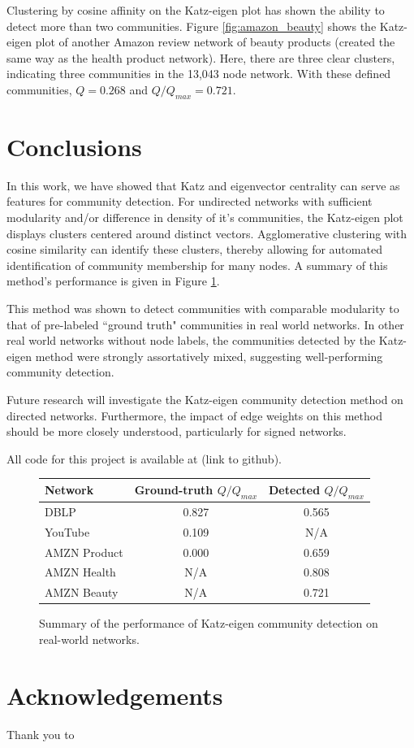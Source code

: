 \documentclass{IEEEtran}
\begin{document}
	Clustering by cosine affinity on the Katz-eigen plot has shown the ability to detect more than two communities. Figure \ref{fig:amazon_beauty} shows the Katz-eigen plot of another Amazon review network of beauty products (created the same way as the health product network). Here, there are three clear clusters, indicating three communities in the 13,043 node network. With these defined communities, $Q=0.268$ and $Q/Q_{max}=0.721$.
	
	
	\section{Conclusions}
	\label{s:conc}
	In this work, we have showed that Katz and eigenvector centrality can serve as features for community detection. For undirected networks with sufficient modularity and/or difference in density of it's communities, the Katz-eigen plot displays clusters centered around distinct vectors. Agglomerative clustering with cosine similarity can identify these clusters, thereby allowing for automated identification of community membership for many nodes. A summary of this method's performance is given in Figure \ref{tab:performance}.
	
	This method was shown to detect communities with comparable modularity to that of pre-labeled ``ground truth" communities in real world networks. In other real world networks without node labels, the communities detected by the Katz-eigen method were strongly assortatively mixed, suggesting well-performing community detection.
	
	Future research will investigate the Katz-eigen community detection method on directed networks. Furthermore, the impact of edge weights on this method should be more closely understood, particularly for signed networks.
	
	All code for this project is available at (link to github).
	
	\begin{figure}
		\centering
		\begin{tabular}{lcc}
			\toprule
			\textbf{Network} & \textbf{Ground-truth} $Q/Q_{max}$ & \textbf{Detected $Q/Q_{max}$}\\
			\midrule
			DBLP & 0.827 & 0.565\\
			YouTube & 0.109 & N/A\\
			AMZN Product & 0.000 & 0.659\\
			AMZN Health & N/A & 0.808\\
			AMZN Beauty & N/A & 0.721\\
			\bottomrule
		\end{tabular}
		\caption{Summary of the performance of Katz-eigen community detection on real-world networks.}
		\label{tab:performance}
	\end{figure}
	
	\section*{Acknowledgements}
	Thank you to \textellipsis

	
	
\end{document}
